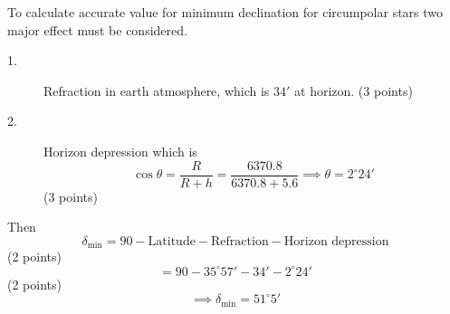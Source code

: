 To calculate accurate value for minimum declination for circumpolar stars two
major effect must be considered.

\begin{description}
\item[1.] Refraction in earth atmosphere, which is $34'$ at horizon.
  \hfill(3 points)
\item[2.] Horizon depression which is
  \[
    \cos\theta = \frac{R}{R + h} = \frac{6370.8}{6370.8 + 5.6}
    \implies \theta = 2^\circ 24'
  \]
  \hfill(3 points)
\end{description}

Then
\[
  \delta_{\min} = 90 - \text{Latitude} - \text{Refraction}
    - \text{Horizon depression}
\]
\hfill(2 points)
\[
  = 90 - 35^\circ 57' - 34' - 2^\circ 24'
\]
\hfill(2 points)
\[
  \implies \delta_{\min} = 51^\circ 5'
\]

